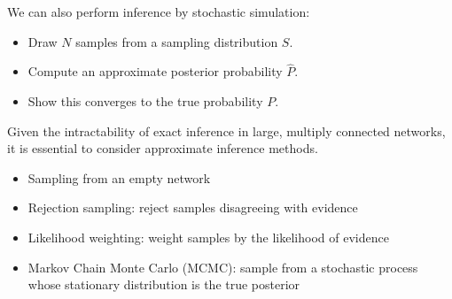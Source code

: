\documentclass[12pt]{article}
\begin{document}
\begin{enumerate}[label=\textbf{U.\arabic*}]
          We can also perform inference by stochastic simulation:
          \begin{itemize}
              \item Draw $N$ samples from a sampling distribution $S$.
              \item Compute an approximate posterior probability $\hat{P}$.
              \item Show this converges to the true probability $P$.
          \end{itemize}

          Given the intractability of exact inference in large, multiply connected networks, it is essential to consider approximate inference methods.
          \begin{itemize}
              \item Sampling from an empty network
              \item Rejection sampling: reject samples disagreeing with evidence
              \item Likelihood weighting: weight samples by the likelihood of evidence
              \item Markov Chain Monte Carlo (MCMC): sample from a stochastic process whose stationary distribution is the true posterior
          \end{itemize}

\end{enumerate}
\end{document}
